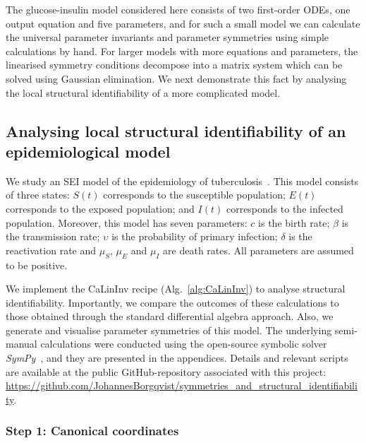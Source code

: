 \documentclass[12pt]{article}
\begin{document}
The glucose-insulin model considered here consists of two first-order ODEs, one output equation and five parameters, and for such a small model we can calculate the universal parameter invariants and parameter symmetries using simple calculations by hand. For larger models with more equations and parameters, the linearised symmetry conditions decompose into a matrix system which can be solved using Gaussian elimination. We next demonstrate this fact by analysing the local structural identifiability of a more complicated model. 


\subsection{Analysing local structural identifiability of an epidemiological model}

We study an SEI model of the epidemiology of tuberculosis~\cite{renardy2022structural}. This model consists of three states: $S(t)$ corresponds to the susceptible population; $E(t)$ corresponds to the exposed population; and $I(t)$ corresponds to the infected population. Moreover, this model has seven parameters: $c$ is the birth rate; $\beta$ is the transmission rate; $\upsilon$ is the probability of primary infection; $\delta$ is the reactivation rate and $\mu_{S}$, $\mu_{E}$ and $\mu_{I}$ are death rates. All parameters are assumed to be positive.

We implement the CaLinInv recipe (Alg.~\ref{alg:CaLinInv}) to analyse structural identifiability. Importantly, we compare the outcomes of these calculations to those obtained through the standard differential algebra approach. Also, we generate and visualise parameter symmetries of this model. The underlying semi-manual calculations were conducted using the open-source symbolic solver \textit{SymPy}~\cite{meurer2017sympy}, and they are presented in the appendices. Details and relevant scripts are  available at the public GitHub-repository associated with this project: \url{https://github.com/JohannesBorgqvist/symmetries_and_structural_identifiability}. 


\subsubsection*{Step 1: Canonical coordinates}
\end{document}
